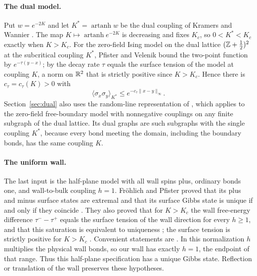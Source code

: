\paragraph{The dual model.}
Put $w=e^{-2K}$ and let $K^*=\operatorname{artanh}w$ be the dual coupling of Kramers and Wannier \cite{KW41}. The map $K\mapsto\operatorname{artanh}e^{-2K}$ is decreasing and fixes $K_c$, so $0<K^*<K_c$ exactly when $K>K_c$. For the zero-field Ising model on the dual lattice $(\mathbb Z+\tfrac12)^2$ at the subcritical coupling $K^*$, Pfister and Velenik \cite[Proposition~2.4 and (6.46)]{PV99} bound the two-point function by $e^{-\tau(y-x)}$; by \cite[Propositions~2.1 and~2.2]{PV99} the decay rate $\tau$ equals the surface tension of the model at coupling $K$, a norm on $\mathbb R^2$ that is strictly positive since $K>K_c$. Hence there is $c_\tau=c_\tau(K)>0$ with
\begin{equation}\label{eq:dualdecay}
 \langle\sigma_x\sigma_y\rangle_{K^*}\le e^{-c_\tau\|x-y\|_\infty}.
\end{equation}
Section~\ref{sec:dual} also uses the random-line representation of \cite[Section~6]{PV99}, which applies to the zero-field free-boundary model with nonnegative couplings on any finite subgraph of the dual lattice. Its dual graphs are such subgraphs with the single coupling $K^*$, because every bond meeting the domain, including the boundary bonds, has the same coupling $K$.

\paragraph{The uniform wall.}
The last input is the half-plane model with all wall spins plus, ordinary bonds one, and wall-to-bulk coupling $h=1$. Fr\"ohlich and Pfister proved that its plus and minus surface states are extremal and that its surface Gibbs state is unique if and only if they coincide \cite{FP1}. They also proved that for $K>K_c$ the wall free-energy difference $\tau^--\tau^+$ equals the surface tension of the wall direction for every $h\ge1$, and that this saturation is equivalent to uniqueness \cite{FP2}; the surface tension is strictly positive for $K>K_c$ \cite{LP81}. Convenient statements are \cite[(3.17) and (3.25)]{PV}. In this normalization $h$ multiplies the physical wall bonds, so our wall has exactly $h=1$, the endpoint of that range. Thus this half-plane specification has a unique Gibbs state. Reflection or translation of the wall preserves these hypotheses.

